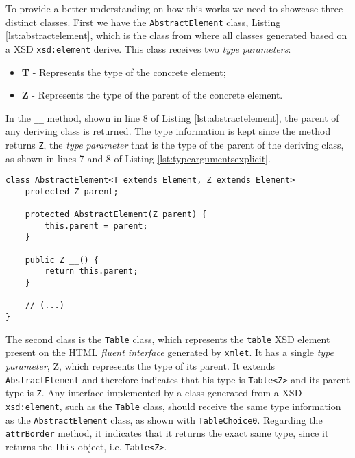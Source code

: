 \noindent
To provide a better understanding on how this works we need to showcase three distinct classes. First we have the \texttt{AbstractElement} class, Listing \ref{lst:abstractelement}, which is the class from where all classes generated based on a \ac{XSD} \texttt{xsd:element} derive. This class receives two \textit{type parameters}: 

\begin{itemize}
	\item \textbf{T} - Represents the type of the concrete element; 
	\item \textbf{Z} - Represents the type of the parent of the concrete element.
\end{itemize}	


\noindent
In the \texttt{\_\_} method, shown in line 8 of Listing \ref{lst:abstractelement}, the parent of any deriving class is returned. The type information is kept since the method returns \texttt{Z}, the \textit{type parameter} that is the type of the parent of the deriving class, as shown in lines 7 and 8 of Listing \ref{lst:typeargumentsexplicit}.

\bigskip

\begin{minipage}{\linewidth}
\begin{lstlisting}[caption={AbstractElement Class Type Arguments},captionpos=b,label={lst:abstractelement}]
class AbstractElement<T extends Element, Z extends Element>
	protected Z parent;
	
    protected AbstractElement(Z parent) {
        this.parent = parent;
    }	
	
	public Z __() {
		return this.parent;
	}
	
	// (...)
}
\end{lstlisting}
\end{minipage}

\noindent
The second class is the \texttt{Table} class, which represents the \texttt{table} \ac{XSD} element present on the \ac{HTML} \textit{fluent interface} generated by \texttt{xmlet}. It has a single \textit{type parameter}, Z, which represents the type of its parent. It extends \texttt{AbstractElement} and therefore indicates that his type is \texttt{Table<Z>} and its parent type is \texttt{Z}. Any  interface implemented by a class generated from a \ac{XSD} \texttt{xsd:element}, such as the \texttt{Table} class, should receive the same type information as the \texttt{AbstractElement} class, as shown with \texttt{TableChoice0}. Regarding the \texttt{attrBorder} method, it indicates that it returns the exact same type, since it returns the \texttt{this} object, i.e. \texttt{Table<Z>}.

